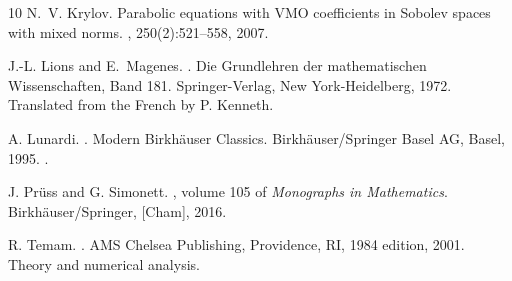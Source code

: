 \documentclass[reqno]{amsart}
\numberwithin{equation}{section}
\theoremstyle{plain}
\theoremstyle{definition}
\begin{document}
\begin{thebibliography}{10}
N.~V. Krylov.
\newblock Parabolic equations with {VMO} coefficients in {S}obolev spaces with
  mixed norms.
, 250(2):521--558, 2007.

J.-L. Lions and E.~Magenes.
.
\newblock Die Grundlehren der mathematischen Wissenschaften, Band 181.
  Springer-Verlag, New York-Heidelberg, 1972.
\newblock Translated from the French by P. Kenneth.

A. Lunardi.
.
\newblock Modern Birkh\"{a}user Classics. Birkh\"{a}user/Springer Basel AG,
  Basel, 1995.
.

J. Pr\"uss and G. Simonett.
, volume 105 of {\em Monographs in Mathematics}.
\newblock Birkh\"auser/Springer, [Cham], 2016.

R. Temam.
.
\newblock AMS Chelsea Publishing, Providence, RI, 1984 edition, 2001.
\newblock Theory and numerical analysis.



\end{thebibliography}
\end{document}
